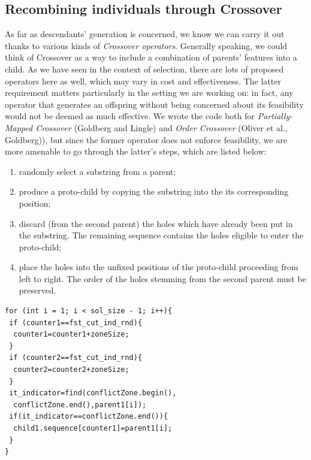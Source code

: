 \documentclass[letterpaper, 10 pt, conference]{ieeeconf}  %
\begin{document}
\subsection{Recombining individuals through Crossover}
As far as descendants' generation is concerned, we know we can carry it out thanks to various kinds of \textit{Crossover operators}. Generally speaking, we
could think of Crossover as a way to include a combination of parents' features into a child. As we have seen in the context of selection, there are lots of proposed operators here as well, which may vary in cost and
effectiveness. The latter requirement matters particularly in the setting we are working on: in fact, any operator that generates an offspring without being concerned about its feasibility would not be deemed as much effective.
We wrote the code both for \textit{Partially-Mapped Crossover} (Goldberg and Lingle) and \textit{Order Crossover} (Oliver et al., Goldberg)), but since the former operator does not enforce feasibility, we are more amenable to go through the latter's steps, which are listed below:
\begin{enumerate}
\item randomly select a substring from a parent;
\item produce a proto-child by copying the substring into the
its corresponding position;
\item discard (from the second parent) the holes which have already been put in the substring. The remaining sequence contains the holes eligible to enter the proto-child;
\item place the holes into the unfixed positions of the proto-child proceeding from left to right. The order of the holes stemming from the second parent must be preserved.
\end{enumerate}


\begin{lstlisting}[caption={Order Crossover, in \texttt{TSPCrossover.cpp}}]
for (int i = 1; i < sol_size - 1; i++){
 if (counter1==fst_cut_ind_rnd){
  counter1=counter1+zoneSize;
 }
 if (counter2==fst_cut_ind_rnd){
  counter2=counter2+zoneSize;
 }
 it_indicator=find(conflictZone.begin(),
  conflictZone.end(),parent1[i]);
 if(it_indicator==conflictZone.end()){
  child1.sequence[counter1]=parent1[i]; 		                          
 }
}		
\end{lstlisting}
\end{document}
